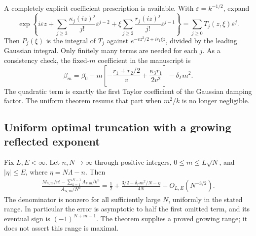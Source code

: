 A completely explicit coefficient prescription is available. With
$\varepsilon=k^{-1/2}$, expand
\begin{equation}\label{moderate:eq:algorithm}
 \exp\left\{i\varepsilon z+
 \sum_{j\ge3}\frac{\kappa_j(iz)^j}{j!}\varepsilon^{j-2}
 +\xi\sum_{j\ge2}\frac{r_j(iz)^j}{j!}\varepsilon^{j-1}\right\}
 =\sum_{j\ge0}T_j(z,\xi)\varepsilon^j.
\end{equation}
Then $P_j(\xi)$ is the integral of $T_j$ against
$e^{-vz^2/2+ir_1\xi z}$, divided by the leading Gaussian integral.
Only finitely many terms are needed for each $j$.
As a consistency check, the fixed-$m$ coefficient in the manuscript is
\[
 \beta_m=\beta_0+
 m\left[-\frac{r_1+r_2/2}{v}+\frac{\kappa_3r_1}{2v^2}\right]
 -\delta_\Gamma m^2.
\]
The quadratic term is exactly the first Taylor coefficient of the
Gaussian damping factor. The uniform theorem resums that part when
$m^2/k$ is no longer negligible.

\subsection{Uniform optimal truncation with a growing reflected exponent}

\begin{theorem}\label{moderate:thm:half}
Fix $L,E<\infty$. Let $n,N\to\infty$ through positive integers,
$0\le m\le L\sqrt{N}$, and $|\eta|\le E$, where
$\eta=N\Lambda-n$. Then
\begin{align}\label{moderate:eq:half}
 \frac{M_{n,m}/n!-\sum_{k=1}^{N-1}A_{k,m}/k^n}{A_{N,m}/N^n}
 =\frac12+
 \frac{3/2-\delta_\Gamma m^2/N-\eta}{4N}
 +O_{L,E}(N^{-3/2}).
\end{align}
The denominator is nonzero for all sufficiently large $N$, uniformly
in the stated range. In particular the error is asymptotic to half the
first omitted term, and its eventual sign is $(-1)^{N+m-1}$.
The theorem supplies a proved growing range; it does not assert this
range is maximal.
\end{theorem}


